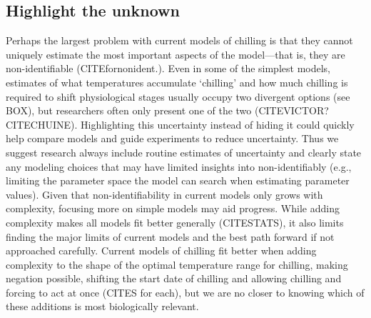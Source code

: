 \documentclass[11pt]{article}
\begin{document}
\subsection*{Highlight the unknown} 
Perhaps the largest problem with current models of chilling is that they cannot uniquely estimate the most important aspects of the model---that is, they are non-identifiable (CITEfornonident.). Even in some of the simplest models, estimates of what temperatures accumulate `chilling' and how much chilling is required to shift physiological stages usually occupy two divergent options (see BOX), but researchers often only present one of the two (CITEVICTOR? CITECHUINE). Highlighting this uncertainty instead of hiding it could quickly help compare models and guide experiments to reduce uncertainty. Thus we suggest research always include routine estimates of uncertainty and clearly state any modeling choices that may have limited insights into non-identifiably (e.g., limiting the parameter space the model can search when estimating parameter values). Given that non-identifiability in current models only grows with complexity, focusing more on simple models may aid progress. While adding complexity makes all models fit better generally (CITESTATS), it also limits finding the major limits of current models and the best path forward if not approached carefully. Current models of chilling fit better when adding complexity to the shape of the optimal temperature range for chilling, making negation possible, shifting the start date of chilling and allowing chilling and forcing to act at once (CITES for each), but we are no closer to knowing which of these additions is most biologically relevant. 
\end{document}
